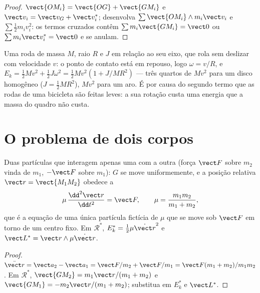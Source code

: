 \begin{proof}
$\vect{OM_i} = \vect{OG} + \vect{GM_i}$ e $\vect v_i = \vect v_G + \vect v_i^*$;
desenvolva $\sum\vect{OM_i}\wedge m_i\vect v_i$ e $\sum\tfrac12 m_iv_i^2$: os termos
cruzados contêm $\sum m_i\vect{GM_i} = \vect 0$ ou $\sum m_i\vect v_i^* = \vect 0$
e se anulam.
\end{proof}

\begin{example}\label{ex:b1:systems-of-points:rolling}
Uma roda de massa $M$, raio $R$ e  $J$ em relação ao seu
eixo, que rola sem deslizar com velocidade $v$: o ponto de contato está em repouso, logo
$\omega = v/R$, e $E_k = \tfrac12 Mv^2 + \tfrac12 J\omega^2 = \tfrac12 Mv^2(1 +
J/MR^2)$ --- três quartos de $Mv^2$ para um disco homogêneo ($J = \tfrac12 MR^2$),
$Mv^2$ para um aro. É por causa do segundo termo que as rodas de uma
bicicleta são feitas leves: a sua rotação custa uma energia que a massa do quadro não custa.
\end{example}

\section{O problema de dois corpos}

\begin{proposition}\label{prop:b1:systems-of-points:twobody}
Duas partículas que interagem apenas uma com a outra (força $\vect F$ sobre $m_2$
vinda de $m_1$, $-\vect F$ sobre $m_1$): $G$ se move uniformemente, e a posição
relativa $\vect r = \vect{M_1M_2}$ obedece a
\[
\mu\,\frac{\dd^2\vect r}{\dd t^2} = \vect F, \qquad \mu = \frac{m_1m_2}{m_1 + m_2},
\]
que é a equação de uma única partícula fictícia de \emph{} $\mu$
que se move sob $\vect F$ em torno de um centro fixo. Em $\mathcal R^*$, $E_k^* =
\tfrac12\mu\dot{\vect r}^2$ e $\vect L^* = \vect r\wedge\mu\dot{\vect r}$.
\end{proposition}

\begin{proof}
$\ddot{\vect r} = \vect a_2 - \vect a_1 = \vect F/m_2 + \vect F/m_1 = \vect F(m_1 +
m_2)/m_1m_2$. Em $\mathcal R^*$, $\vect{GM_2} = m_1\vect r/(m_1 + m_2)$ e
$\vect{GM_1} = -m_2\vect r/(m_1 + m_2)$; substitua em $E_k^*$ e $\vect L^*$.
\end{proof}

